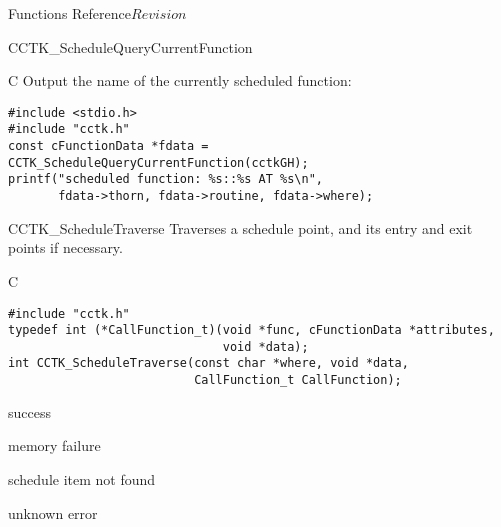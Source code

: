 \begin{cactuspart}{ Functions Reference}{}{$Revision$}
\begin{FunctionDescription}{CCTK\_ScheduleQueryCurrentFunction}
  \begin{ExampleSection}
    \begin{Example}{C}
      Output the name of the currently scheduled function:
\begin{verbatim}
#include <stdio.h>
#include "cctk.h"
const cFunctionData *fdata = CCTK_ScheduleQueryCurrentFunction(cctkGH);
printf("scheduled function: %s::%s AT %s\n",
       fdata->thorn, fdata->routine, fdata->where);
\end{verbatim}
\end{Example}
  \end{ExampleSection}
  
\end{FunctionDescription}




\begin{FunctionDescription}{CCTK\_ScheduleTraverse}
  \label{CCTK-ScheduleTraverse}
  Traverses a schedule point, and its entry and exit points if necessary.

  \begin{SynopsisSection}
    \begin{Synopsis}{C}
\begin{verbatim}
#include "cctk.h"
typedef int (*CallFunction_t)(void *func, cFunctionData *attributes,
                              void *data);
int CCTK_ScheduleTraverse(const char *where, void *data,
                          CallFunction_t CallFunction);
\end{verbatim}
    \end{Synopsis}
  \end{SynopsisSection}

  \begin{ResultSection}
    \begin{Result}{0}
      success
    \end{Result}
    \begin{Result}{1}
      memory failure
    \end{Result}
    \begin{Result}{2}
      schedule item not found
    \end{Result}
    \begin{Result}{3}
      unknown error
    \end{Result}
  \end{ResultSection}


\end{FunctionDescription}
\end{cactuspart}
